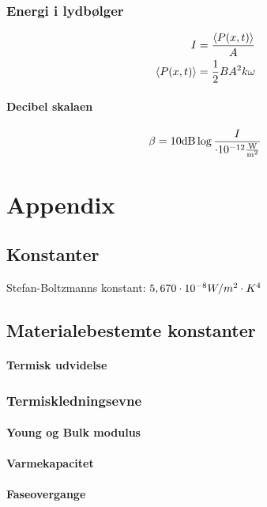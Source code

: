 \documentclass[a4paper,oneside,article]{memoir}
\begin{document}
\subsection{Energi i lydbølger} \label{ssc:energilyd}
\begin{align*}
    I &= \frac{\br[3]{P(x,t)}}{A}\\
    \br[3]{P(x,t)} &= \frac{1}{2}BA^2k\omega
\end{align*}
\subsubsection{Decibel skalaen} \label{sssc:decibel}
\begin{align*}
    \beta = 10\text{dB} \log\frac{I}{\cdot 10^{-12}\frac{\text{W}}{\text{m}^2}}
\end{align*}


\newpage
\chapter{Appendix}
\setcounter{tocdepth}{1}
\section{Konstanter} \label{asc:konstanter}
Stefan-Boltzmanns konstant: $5,670\cdot 10^{-8} W/m^2\cdot K^4$ 

\section{Materialebestemte konstanter} \label{asc:materialekonst}
\subsubsection{Termisk udvidelse}
\subsection{Termiskledningsevne}
\subsubsection{Young og Bulk modulus}
\subsubsection{Varmekapacitet}
\subsubsection{Faseovergange}
\end{document}
